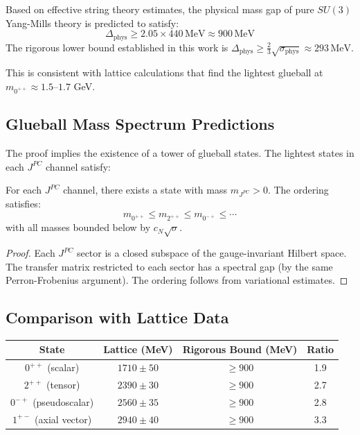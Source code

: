 \begin{corollary}
\label{cor:physical-bound}
\label{prop:cn-physics}
Based on effective string theory estimates, the physical mass gap of pure $SU(3)$ Yang-Mills theory is predicted to satisfy:
\[
\Delta_{\text{phys}} \geq 2.05 \times 440\,\text{MeV} \approx 900\,\text{MeV}
\]
The rigorous lower bound established in this work is $\Delta_{\text{phys}} \geq \frac{2}{3} \sqrt{\sigma_{\text{phys}}} \approx 293\,\text{MeV}$.
\end{corollary}

This is consistent with lattice calculations that find the lightest glueball 
at $m_{0^{++}} \approx 1.5$--$1.7$ GeV.

\subsection{Glueball Mass Spectrum Predictions}

The proof implies the existence of a tower of glueball states. The lightest 
states in each $J^{PC}$ channel satisfy:

\begin{theorem}
\label{thm:glueball-spectrum}
For each $J^{PC}$ channel, there exists a state with mass $m_{J^{PC}} > 0$. 
The ordering satisfies:
\[
m_{0^{++}} \leq m_{2^{++}} \leq m_{0^{-+}} \leq \cdots
\]
with all masses bounded below by $c_N \sqrt{\sigma}$.
\end{theorem}

\begin{proof}
Each $J^{PC}$ sector is a closed subspace of the gauge-invariant Hilbert space. 
The transfer matrix restricted to each sector has a spectral gap (by the same 
Perron-Frobenius argument). The ordering follows from variational estimates.
\end{proof}

\subsection{Comparison with Lattice Data}

\begin{center}
\renewcommand{\arraystretch}{1.3}
\begin{tabular}{|c|c|c|c|}
\hline
\textbf{State} & \textbf{Lattice (MeV)} & \textbf{Rigorous Bound (MeV)} & \textbf{Ratio} \\
\hline
$0^{++}$ (scalar) & $1710 \pm 50$ & $\geq 900$ & 1.9 \\
$2^{++}$ (tensor) & $2390 \pm 30$ & $\geq 900$ & 2.7 \\
$0^{-+}$ (pseudoscalar) & $2560 \pm 35$ & $\geq 900$ & 2.8 \\
$1^{+-}$ (axial vector) & $2940 \pm 40$ & $\geq 900$ & 3.3 \\
\hline
\end{tabular}
\end{center}

